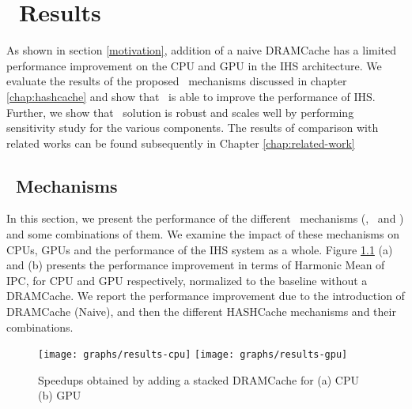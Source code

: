 \chapter{\cachename\ Results} \label{chap:results}
As shown in section \ref{motivation}, addition of a naive DRAMCache has a limited performance improvement on the CPU and GPU in the IHS architecture. We evaluate the results of the proposed \cachename\ mechanisms discussed in chapter \ref{chap:hashcache} and show that \cachename\ is able to improve the performance of IHS. Further, we show that \cachename\ solution is robust and scales well by performing sensitivity study for the various components. The results of comparison with related works can be found subsequently in Chapter \ref{chap:related-work}

\section{\cachename\ Mechanisms}
In this section, we present the performance of the different \cachename\ mechanisms (\prioname, \bypassname\ and \chaining) and some combinations of them. We examine the impact of these mechanisms on CPUs, GPUs and the performance of the IHS system as a whole. Figure \ref{results-speedup} (a) and (b) presents the performance improvement in terms of Harmonic Mean of IPC, for CPU and GPU respectively, normalized to the baseline without a DRAMCache. We report the performance improvement due to the introduction of DRAMCache (Naive),  and then the different HASHCache mechanisms  and their combinations.

\begin{figure}[htb]
	\centering
	\texttt{[image: graphs/results-cpu]}
	\texttt{[image: graphs/results-gpu]}
	\caption{Speedups obtained by adding a stacked DRAMCache for (a) CPU (b) GPU}
	\label{results-speedup}
\end{figure}

